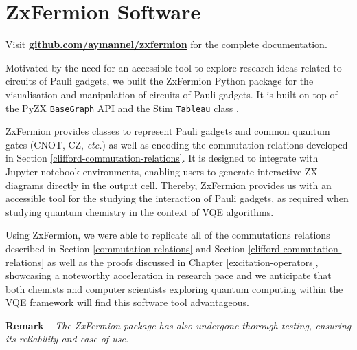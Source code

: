 \chapter{ZxFermion Software}%
\label{zxfermion}

Visit \textbf{\href{https://github.com/aymannel/zxfermion}{github.com/aymannel/zxfermion} }for the complete documentation.

Motivated by the need for an accessible tool to explore research ideas related to circuits of Pauli gadgets, we built the ZxFermion Python package for the visualisation and manipulation of circuits of Pauli gadgets. It is built on top of the PyZX \lstinline{BaseGraph} API \cite{Kissinger2020} and the Stim \lstinline{Tableau} class \cite{Gidney2021}.

ZxFermion provides classes to represent Pauli gadgets and common quantum gates (CNOT, CZ, \textit{etc.}) as well as encoding the commutation relations developed in Section \ref{clifford-commutation-relations}. It is designed to integrate with Jupyter notebook environments, enabling users to generate interactive ZX diagrams directly in the output cell. Thereby, ZxFermion provides us with an accessible tool for the studying the interaction of Pauli gadgets, as required when studying quantum chemistry in the context of VQE algorithms.

Using ZxFermion, we were able to replicate all of the commutations relations described in Section \ref{commutation-relations} and Section \ref{clifford-commutation-relations} as well as the proofs discussed in Chapter \ref{excitation-operators}, showcasing a noteworthy acceleration in research pace and we anticipate that both chemists and computer scientists exploring quantum computing within the VQE framework will find this software tool advantageous.

\hangindent=10pt 
\textbf{Remark} -- \textit{The ZxFermion package has also undergone thorough testing, ensuring its reliability and ease of use.}

